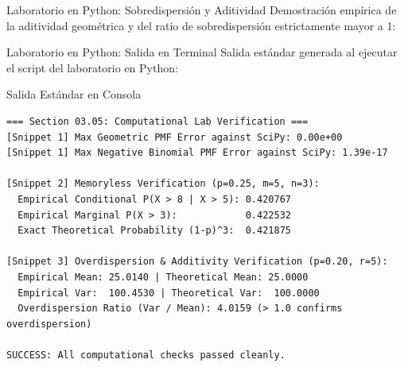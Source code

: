 \documentclass[10pt, aspectratio=169]{beamer}
\begin{document}
\begin{frame}[fragile]{Laboratorio en Python: Sobredispersión y Aditividad}
  \scriptsize
  Demostración empírica de la aditividad geométrica y del ratio de sobredispersión estrictamente mayor a 1:
  \vspace{0.08cm}
  {
  }
\end{frame}

\begin{frame}[fragile]{Laboratorio en Python: Salida en Terminal}
  \scriptsize
  Salida estándar generada al ejecutar el script del laboratorio en Python:
  \vspace{0.05cm}
  \begin{block}{Salida Estándar en Consola}
    \fontsize{6pt}{7pt}\selectfont
    \begin{verbatim}
=== Section 03.05: Computational Lab Verification ===
[Snippet 1] Max Geometric PMF Error against SciPy: 0.00e+00
[Snippet 1] Max Negative Binomial PMF Error against SciPy: 1.39e-17

[Snippet 2] Memoryless Verification (p=0.25, m=5, n=3):
  Empirical Conditional P(X > 8 | X > 5): 0.420767
  Empirical Marginal P(X > 3):            0.422532
  Exact Theoretical Probability (1-p)^3:  0.421875

[Snippet 3] Overdispersion & Additivity Verification (p=0.20, r=5):
  Empirical Mean: 25.0140 | Theoretical Mean: 25.0000
  Empirical Var:  100.4530 | Theoretical Var:  100.0000
  Overdispersion Ratio (Var / Mean): 4.0159 (> 1.0 confirms overdispersion)

SUCCESS: All computational checks passed cleanly.
    \end{verbatim}
  \end{block}
\end{frame}
\end{document}
